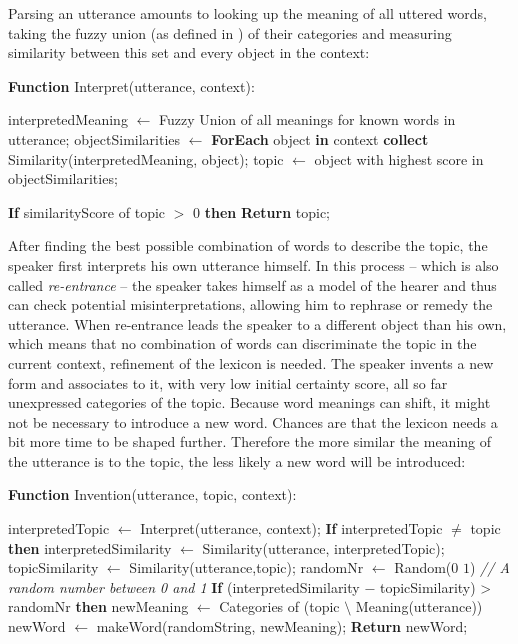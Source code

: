  Parsing an utterance amounts to looking
up the meaning of all uttered words, taking the fuzzy union (as
defined in \citealp{zadeh65fuzzy}) of their categories and measuring
similarity between this set and every object in the context:

\begin{verbatim+}
\textbf{Function} Interpret(utterance, context):

interpretedMeaning $\leftarrow$ Fuzzy Union of all meanings for known words in utterance;
objectSimilarities $\leftarrow$ \textbf{ForEach} object \textbf{in} context 
                         \textbf{collect} Similarity(interpretedMeaning, object);
topic $\leftarrow$ object with highest score in objectSimilarities;

\textbf{If} similarityScore of topic $>$ 0
    \textbf{then} \textbf{Return} topic;
\end{verbatim+}

 After finding the best possible combination of
words to describe the topic, the speaker first interprets his own
utterance himself. In this process -- which is also called
\emph{re-entrance} \citep{steels03re-entrance} -- the speaker takes
himself as a model of the hearer and thus can check potential
misinterpretations, allowing him to rephrase or remedy the
utterance. When re-entrance leads the speaker to a different object
than his own, which means that no combination of words can
discriminate the topic in the current context, refinement of the
lexicon is needed.  The speaker invents a new form and associates to
it, with very low initial certainty score, all so far unexpressed
categories of the topic. Because word meanings can shift, it might not
be necessary to introduce a new word. Chances are that the lexicon
needs a bit more time to be shaped further. Therefore the more similar
the meaning of the utterance is to the topic, the less likely a new
word will be introduced:

\begin{verbatim+}
\textbf{Function} Invention(utterance, topic, context):

interpretedTopic $\leftarrow$ Interpret(utterance, context);
\textbf{If} interpretedTopic $\neq$ topic
\textbf{then}
    interpretedSimilarity $\leftarrow$ Similarity(utterance, interpretedTopic);
    topicSimilarity $\leftarrow$ Similarity(utterance,topic);
    randomNr $\leftarrow$ Random($0$ $1$) \textit{// A random number between 0 and 1}
    \textbf{If} (interpretedSimilarity $-$ topicSimilarity) > randomNr
    \textbf{then} 
        newMeaning $\leftarrow$ Categories of (topic $\setminus$  Meaning(utterance)) 
        newWord $\leftarrow$ makeWord(randomString, newMeaning);
        \textbf{Return} newWord;
\end{verbatim+}


